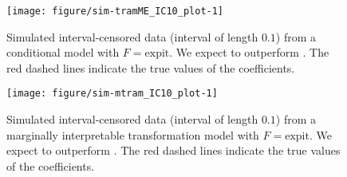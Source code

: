 \documentclass[article,nojss,shortnames]{jss}\usepackage[]{graphicx}\usepackage[]{xcolor}
\newcommand{\expit}{\text{expit}}
\begin{document}
\begin{figure}
\begin{Schunk}


{\centering \texttt{[image: figure/sim-tramME\_IC10\_plot-1]} 

}

\end{Schunk}
\caption{Simulated interval-censored data (interval of length $0.1$)
from a conditional model with $F = \expit$.
We expect  to outperform .
The red dashed lines indicate the true values of the coefficients.
\label{fig:sim-tramME_IC10}}
\end{figure}



\begin{figure}
\begin{Schunk}


{\centering \texttt{[image: figure/sim-mtram\_IC10\_plot-1]} 

}

\end{Schunk}
\caption{Simulated interval-censored data (interval of length $0.1$)
from a marginally interpretable transformation
model with $F = \expit$.
We expect  to outperform .
The red dashed lines indicate the true values of the coefficients.
\label{fig:sim-mtram_IC10}}
\end{figure}


\end{document}
